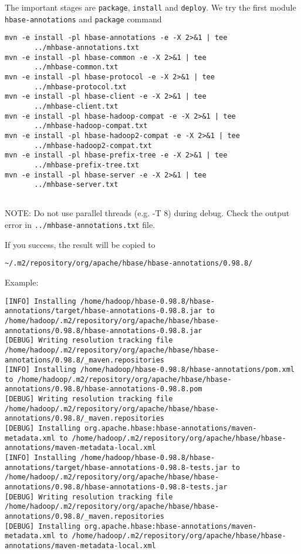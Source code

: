 The important stages are \verb!package!, \verb!install! and \verb!deploy!. We
try the first module \verb!hbase-annotations! and \verb!package! command
\begin{verbatim}
mvn -e install -pl hbase-annotations -e -X 2>&1 | tee
       ../mhbase-annotations.txt
mvn -e install -pl hbase-common -e -X 2>&1 | tee
       ../mhbase-common.txt
mvn -e install -pl hbase-protocol -e -X 2>&1 | tee
       ../mhbase-protocol.txt
mvn -e install -pl hbase-client -e -X 2>&1 | tee
       ../mhbase-client.txt
mvn -e install -pl hbase-hadoop-compat -e -X 2>&1 | tee
       ../mhbase-hadoop-compat.txt
mvn -e install -pl hbase-hadoop2-compat -e -X 2>&1 | tee
       ../mhbase-hadoop2-compat.txt
mvn -e install -pl hbase-prefix-tree -e -X 2>&1 | tee
       ../mhbase-prefix-tree.txt       
mvn -e install -pl hbase-server -e -X 2>&1 | tee
       ../mhbase-server.txt
       
\end{verbatim}
NOTE: Do not use parallel threads (e.g. -T 8) during debug.
Check the output error in \verb!../mhbase-annotations.txt! file.

If you success, the result will be copied to 
\begin{verbatim}
~/.m2/repository/org/apache/hbase/hbase-annotations/0.98.8/
\end{verbatim}
Example:
\begin{verbatim}
[INFO] Installing /home/hadoop/hbase-0.98.8/hbase-annotations/target/hbase-annotations-0.98.8.jar to /home/hadoop/.m2/repository/org/apache/hbase/hbase-annotations/0.98.8/hbase-annotations-0.98.8.jar
[DEBUG] Writing resolution tracking file /home/hadoop/.m2/repository/org/apache/hbase/hbase-annotations/0.98.8/_maven.repositories
[INFO] Installing /home/hadoop/hbase-0.98.8/hbase-annotations/pom.xml to /home/hadoop/.m2/repository/org/apache/hbase/hbase-annotations/0.98.8/hbase-annotations-0.98.8.pom
[DEBUG] Writing resolution tracking file /home/hadoop/.m2/repository/org/apache/hbase/hbase-annotations/0.98.8/_maven.repositories
[DEBUG] Installing org.apache.hbase:hbase-annotations/maven-metadata.xml to /home/hadoop/.m2/repository/org/apache/hbase/hbase-annotations/maven-metadata-local.xml
[INFO] Installing /home/hadoop/hbase-0.98.8/hbase-annotations/target/hbase-annotations-0.98.8-tests.jar to /home/hadoop/.m2/repository/org/apache/hbase/hbase-annotations/0.98.8/hbase-annotations-0.98.8-tests.jar
[DEBUG] Writing resolution tracking file /home/hadoop/.m2/repository/org/apache/hbase/hbase-annotations/0.98.8/_maven.repositories
[DEBUG] Installing org.apache.hbase:hbase-annotations/maven-metadata.xml to /home/hadoop/.m2/repository/org/apache/hbase/hbase-annotations/maven-metadata-local.xml
\end{verbatim}


